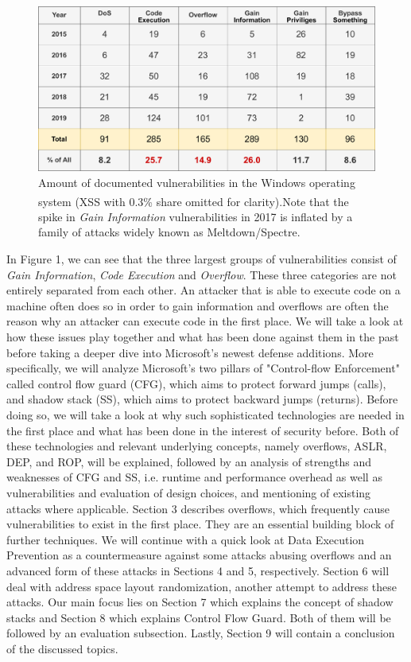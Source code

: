 \documentclass[10pt,twocolumn,a4paper]{article}
\begin{document}
\begin{figure}[h]
\centering
\includegraphics[keepaspectratio,width=\linewidth]{fig/cve}
\caption{Amount of documented vulnerabilities in the Windows operating system (XSS with 0.3\% share omitted for clarity)\textsuperscript{\cite{CVE}}.\newline Note that the spike in \emph{Gain Information} vulnerabilities in 2017 is inflated by a family of attacks widely known as Meltdown/Spectre.}
\end{figure}
\newpage
In Figure 1, we can see that the three largest groups of vulnerabilities consist of \emph{Gain Information}, \emph{Code Execution} and \emph{Overflow}.
These three categories are not entirely separated from each other.
An attacker that is able to execute code on a machine often does so in order to gain information and overflows are often the reason why an attacker can execute code in the first place.
We will take a look at how these issues play together and what has been done against them in the past before taking a deeper dive into Microsoft's newest defense additions.
\newline
More specifically, we will analyze Microsoft's two pillars of "Control-flow Enforcement" called control flow guard (CFG), which aims to protect forward jumps (calls), and shadow stack (SS), which aims to protect backward jumps (returns)\cite{SS}.  Before doing so, we will take a look at why such sophisticated technologies are needed in the first place and what has been done in the interest of security before.
Both of these technologies and relevant underlying concepts, namely overflows, ASLR, DEP, and ROP, will be explained, followed by an analysis of  strengths and weaknesses of CFG and SS, i.e. runtime and performance overhead as well as vulnerabilities and evaluation of design choices,  and mentioning of existing attacks where applicable.
\newline
Section 3 describes overflows, which frequently cause vulnerabilities to exist in the first place.
They are an essential building block of further techniques.
We will continue with a quick look at Data Execution Prevention as a countermeasure against some attacks abusing overflows and an advanced form of these attacks in Sections 4 and 5, respectively.
Section 6 will deal with address space layout randomization, another attempt to address these attacks.
Our main focus lies on Section 7 which explains the concept of shadow stacks and Section 8 which explains Control Flow Guard. Both of them will be followed by an evaluation subsection.
Lastly, Section 9 will contain a conclusion of the discussed topics.
\end{document}
